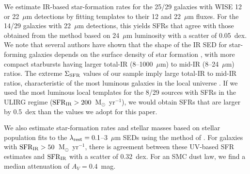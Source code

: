\documentclass[apj]{emulateapj}
\newcommand{\msun}{M$_{\odot}$}
\newcommand{\lrest}{\lambda_{\textnormal{\scriptsize{rest}}}}
\newcommand{\sigmasfr}{\Sigma_{\textnormal{\scriptsize{SFR}}}}
\newcommand{\sfrir}{\textnormal{SFR}_{\textnormal{\scriptsize{IR}}}}
\begin{document}

We estimate IR-based star-formation rates for the 25/29 galaxies with
WISE 12 or 22~$\mu$m detections by fitting \citet{cha01} templates to
their 12 and 22~$\mu$m fluxes.  For the 14/29 galaxies with 22~$\mu$m
detections, this yields SFRs that agree with those obtained from the
\citet{ruj12} method based on 24~$\mu$m luminosity with a scatter of
0.05~dex.  We note that several authors have shown that the shape of
the IR SED for star-forming galaxies depends on the surface density of
star formation \citep[e.g.,][]{ruj11,elb11}, with more compact
starbursts having larger total-IR (8--1000~$\mu$m) to mid-IR
(8--24~$\mu$m) ratios.  The extreme $\sigmasfr$ values of our sample
imply large total-IR to mid-IR ratios, characteristic of the most
luminous galaxies in the local universe
\citep[e.g.,][]{rie09}.  If we used the most luminous
local templates for the 8/29 sources with SFRs in the ULIRG regime
($\sfrir>200$~\msun~yr$^{-1}$), we would obtain SFRs that are larger
by 0.5~dex than the values we adopt for this paper.

We also estimate star-formation rates and stellar masses based on
stellar population fits to the $\lrest=0.1$--3~$\mu$m SEDs using the
method of \citet{mou11}.  For galaxies with
$\sfrir>50$~\msun~yr$^{-1}$, there is agreement between these UV-based
SFR estimates and $\sfrir$ with a scatter of 0.32~dex.  For an SMC
dust law, we find a median attenuation of $A_V=0.4$~mag.
\end{document}
